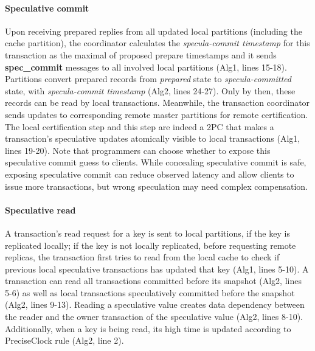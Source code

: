 \paragraph{Speculative commit} Upon receiving prepared replies from all updated local partitions (including the cache partition), the coordinator calculates the \textit{specula-commit timestamp} for this transaction as the maximal of proposed prepare timestamps and it sends \textbf{spec\_commit} messages to all involved local partitions (Alg1, lines 15-18). Partitions convert prepared records from \textit{prepared} state to \textit{specula-committed} state, with \textit{specula-commit timestamp} (Alg2, lines 24-27). Only by then, these records can be read by local transactions. Meanwhile, the transaction coordinator sends updates to corresponding remote master partitions for remote certification. The local certification step and this step are indeed a 2PC that makes a transaction's speculative updates atomically visible to local transactions (Alg1, lines 19-20). Note that programmers can choose whether to expose this speculative commit guess to clients. While concealing speculative commit is safe, exposing speculative commit can reduce observed latency and allow clients to issue more transactions, but wrong speculation may need complex compensation.

\paragraph{Speculative read}  A transaction's read request for a key is sent to local partitions, if the key is replicated locally; if the key is not locally replicated, before requesting remote replicas, the transaction first tries to read from the local cache to check if previous local speculative transactions has updated that key (Alg1, lines 5-10). A transaction can read all transactions committed before its snapshot (Alg2, lines 5-6) as well as local transactions speculatively committed before the snapshot (Alg2, lines 9-13). Reading a speculative value creates data dependency between the reader and the owner transaction of the speculative value (Alg2, lines 8-10). Additionally, when a key is being read, its high time is updated according to PreciseClock rule (Alg2, line 2).

